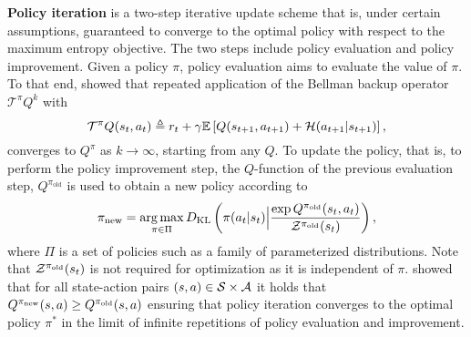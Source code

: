 \textbf{Policy iteration} is a two-step iterative update scheme that is, under certain assumptions, guaranteed to converge to the optimal policy with respect to the maximum entropy objective. The two steps include policy evaluation and policy improvement. 
%
Given a policy $\pi$, policy evaluation aims to evaluate the value of $\pi$. To that end, \cite{haarnoja2018soft} showed that repeated application of the Bellman backup operator $\mathcal{T}^{\pi} Q^{k}$ with 
\begin{equation}
    \label{eq: bellman operator}
    \mathcal{T}^{\pi} Q(s_t,a_t) \triangleq r_t + \gamma \mathbb{E}\left[Q(s_{t+1},a_{t+1}) +\mathcal{H}(a_{t+1}|s_{t+1})\right],
\end{equation}
converges to $Q^{\pi}$ as $k \rightarrow \infty$, starting from any $Q$.
%
To update the policy, that is, to perform the policy improvement step, the $Q$-function of the previous evaluation step, $Q^{\pi_{\text{old}}}$ is used to obtain a new policy according to 
\begin{equation}
\label{eq: marginal policy improvement}
\pi_{\text{new}} = \operatorname*{arg\,max}_{\pi \in \Pi} D_{\text{KL}}\left(\pi(a_t|s_t)\Big|\frac{\exp Q^{\pi_{\text{old}}}(s_t,a_t)}{\mathcal{Z}^{\pi_{\text{old}}}(s_t)}\right),
\end{equation}
where $\Pi$ is a set of policies such as a family of parameterized distributions.
Note that $\mathcal{Z}^{\pi_{\text{old}}}(s_t)$ is not required for optimization as it is independent of $\pi$. \citet{haarnoja2018soft} showed that for all state-action pairs $(s, a) \in \mathcal{S} \times \mathcal{A}$ it holds that $Q^{\pi_{\text{new}}}(s,a) \geq Q^{\pi_{\text{old}}}(s,a)$ ensuring that policy iteration converges to the optimal policy $\pi^*$ in the limit of infinite repetitions of policy evaluation and improvement.

